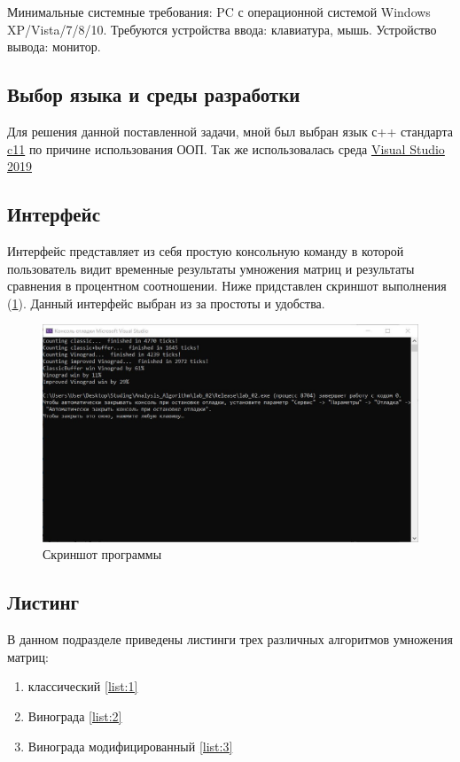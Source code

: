 \documentclass[a4paper, 14pt]{article}
\begin{document}
	Минимальные системные требования: PC с операционной системой Windows XP/Vista/7/8/10. Требуются устройства ввода: клавиатура, мышь. Устройство вывода: монитор.
	
	\subsection{Выбор языка и среды разработки}
	
	Для решения данной поставленной задачи, мной был выбран язык с++ стандарта \href{http://www.open-std.org/jtc1/sc22/wg14/www/docs/n1548.pdf}{c11} по причине использования ООП. Так же использовалась среда \href{https://visualstudio.microsoft.com/ru/vs/}{Visual Studio 2019}
	
	\subsection{Интерфейс}
	
	Интерфейс представляет из себя простую консольную команду в которой пользователь видит временные результаты умножения матриц и результаты сравнения в процентном соотношении. Ниже придставлен скриншот выполнения (\ref{fig:interface}). Данный интерфейс выбран из за простоты и удобства.
	
	\begin{figure}[H]
		\centering
		\includegraphics[width=0.7\linewidth]{screenshots/interface}
		\caption{Скриншот программы}
		\label{fig:interface}
	\end{figure}
	
	\subsection{Листинг}
	
	В данном подразделе приведены листинги трех различных алгоритмов умножения матриц:
	
	\begin{enumerate}
		\item классический \ref{list:1}
		\item Винограда \ref{list:2}
		\item Винограда модифицированный \ref{list:3} 
	\end{enumerate}
		
\end{document}
